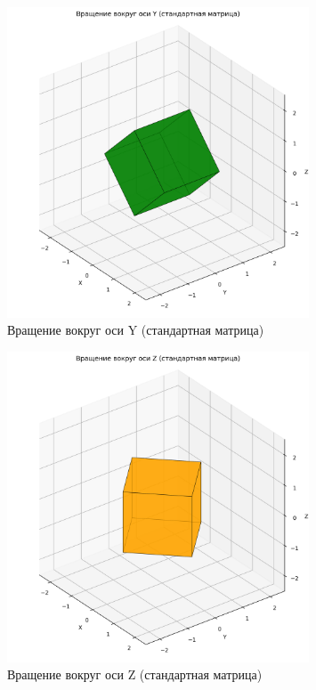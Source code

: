 \begin{figure}[H]
\centering
\includegraphics[width=0.8\textwidth]{images/task4/rotate_y_standard.png}
\caption{Вращение вокруг оси Y (стандартная матрица)}
\end{figure}

\begin{figure}[H]
\centering
\includegraphics[width=0.8\textwidth]{images/task4/rotate_z_standard.png}
\caption{Вращение вокруг оси Z (стандартная матрица)}
\end{figure}


